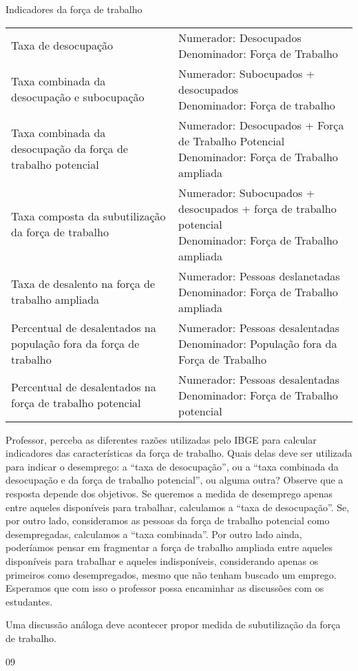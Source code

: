 \begin{sugestions}{Indicadores da força de trabalho}
{\begin{table}[H]
  \begin{tabular}{|d{.4\linewidth}|d{.5\linewidth}|}
  \hline
   &  \\
  \hline
  Taxa de desocupação & \parbox{\linewidth}{Numerador: Desocupados \\ Denominador: Força de Trabalho} \\
  \hline
  Taxa combinada da desocupação e subocupação & \parbox{\linewidth}{Numerador: Subocupados + desocupados \\ Denominador: Força de trabalho} \\
  \hline
  Taxa combinada da desocupação da força de trabalho potencial & \parbox{\linewidth}{Numerador: Desocupados + Força de Trabalho Potencial  \\ Denominador: Força de Trabalho ampliada} \\
  \hline
  Taxa composta da subutilização da força de trabalho & \parbox{\linewidth}{Numerador: Subocupados + desocupados + força de trabalho potencial \\ Denominador: Força de Trabalho ampliada} \\
  \hline
  Taxa de desalento na força de trabalho ampliada & \parbox{\linewidth}{Numerador: Pessoas deslanetadas \\ Denominador: Força de Trabalho ampliada} \\
  \hline
  Percentual de desalentados na população fora da força de trabalho & \parbox{\linewidth}{Numerador: Pessoas desalentadas \\ Denominador: População fora da Força de Trabalho} \\
  \hline
  Percentual de desalentados na força de trabalho potencial & \parbox{\linewidth}{Numerador: Pessoas desalentadas \\ Denominador: Força de Trabalho potencial} \\
  \hline
  \end{tabular}
  \end{table}

  Professor, perceba as diferentes razões utilizadas pelo IBGE para calcular indicadores das características da força de trabalho. Quais delas deve ser utilizada para indicar o desemprego: a “taxa de desocupação”, ou a “taxa combinada da desocupação e da força de trabalho potencial”, ou alguma outra? Observe que a resposta depende dos objetivos. Se queremos a medida de desemprego apenas entre aqueles disponíveis para trabalhar, calculamos a “taxa de desocupação”. Se, por outro lado, consideramos as pessoas da força de trabalho potencial como desempregadas, calculamos a “taxa combinada”. Por outro lado ainda, poderíamos pensar em fragmentar a força de trabalho ampliada entre aqueles disponíveis para trabalhar e aqueles indisponíveis, considerando apenas os primeiros como desempregados, mesmo que não tenham buscado um emprego. Esperamos que com isso o professor possa encaminhar as discussões com os estudantes.

  Uma discussão análoga deve acontecer propor medida de subutilização da força de trabalho.

}{0}{9}
\end{sugestions}

